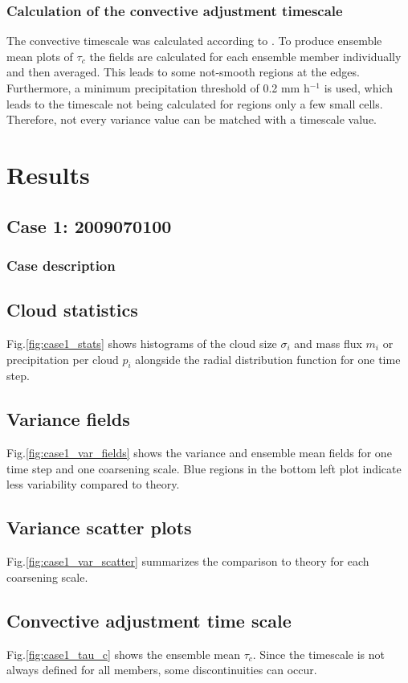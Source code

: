 \documentclass[a4paper, 12pt, draft]{article}
\begin{document}
\subsubsection{Calculation of the convective adjustment timescale}
The convective timescale was calculated according to \cite{Flack2016}. To produce ensemble mean plots of $\tau_c$ the fields are calculated for each ensemble member individually and then averaged. This leads to some not-smooth regions at the edges. Furthermore, a minimum precipitation threshold of 0.2 mm h$^{-1}$ is used, which leads to the timescale not being calculated for regions only a few small cells. Therefore, not every variance value can be matched with a timescale value. 

\section{Results}

\subsection{Case 1: 2009070100}
\subsubsection{Case description}

\subsection{Cloud statistics}
Fig.\ref{fig:case1_stats} shows histograms of the cloud size $\sigma_i$ and mass flux $m_i$ or precipitation per cloud $p_i$ alongside the radial distribution function for one time step. 

\subsection{Variance fields}
Fig.\ref{fig:case1_var_fields} shows the variance and ensemble mean fields for one time step and one coarsening scale. Blue regions in the bottom left plot indicate less variability compared to theory.

\subsection{Variance scatter plots}
Fig.\ref{fig:case1_var_scatter} summarizes the comparison to theory for each coarsening scale.

\subsection{Convective adjustment time scale}
Fig.\ref{fig:case1_tau_c} shows the ensemble mean $\tau_c$. Since the timescale is not always defined for all members, some discontinuities can occur. 
\end{document}
